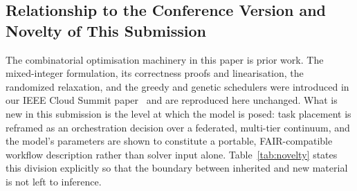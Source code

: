 \subsection{Relationship to the Conference Version and Novelty of This Submission}
\label{subsec:novelty}

The combinatorial optimisation machinery in this paper is prior work. The mixed-integer
formulation, its correctness proofs and linearisation, the randomized relaxation, and the greedy
and genetic schedulers were introduced in our IEEE Cloud Summit paper~\cite{gupta2025efficient}
and are reproduced here unchanged. What is new in this submission is the level at which the model
is posed: task placement is reframed as an orchestration decision over a federated, multi-tier
continuum, and the model's parameters are shown to constitute a portable, FAIR-compatible workflow
description rather than solver input alone. Table~\ref{tab:novelty} states this division explicitly
so that the boundary between inherited and new material is not left to inference.

